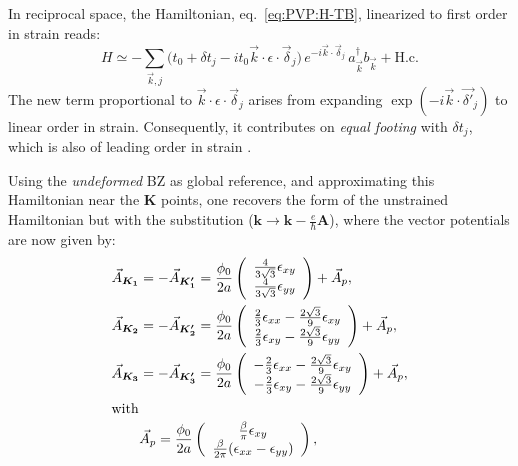 In reciprocal space, the Hamiltonian, eq.~\ref{eq:PVP:H-TB}, linearized to first order in strain reads:
\begin{equation}
  H \simeq -\sum_{\vec{k},j} \bigl(
  t_0 + \delta t_j - it_0\vec{k}\cdot\epsilon\cdot\vec{\delta}_j
  \bigr) \, e^{-i\vec{k}\cdot\vec{\delta}_j} \,
  a_{\vec{k}}^{\dagger}b_{\vec{k}} + \text{H.c.}
  \label{eq:H-TB-strain}
\end{equation}
The new term proportional to $\vec{k}\cdot\epsilon\cdot\vec{\delta}_j$ arises from expanding $\exp(-i\vec{k}\cdot\vec{\delta'}_j)$ to linear order in strain. Consequently, it contributes on \emph{equal footing} with $\delta t_j$, which is also of leading order in strain \cite{CastroNeto2009}.

Using the \emph{undeformed} BZ as global reference, and approximating this Hamiltonian near the $\bm{K}$ points, one recovers the form of the unstrained Hamiltonian but with the substitution ($\bm{k} \to \bm{k}-\frac{e}{\hbar} \bm{A}$), where the vector potentials are now given by:
\begin{subequations}\label{pvp-all}
\begin{align}
\vec{A}_{\bm{K_1}}&=-\vec{A}_{\bm{K_1'}}=\frac{\phi_0}{2a} \left( \begin{array}{c} \frac{4}{3\sqrt{3}}\epsilon_{xy}\\ \frac{4}{3 \sqrt{3}} \epsilon_{yy} \end{array} \right) +\vec{A}_p , \label{pvpK1}\\ 
\vec{A}_{\bm{K_2}}&=-\vec{A}_{\bm{K_2'}}=\frac{\phi_0}{2a} \left( \begin{array}{c} \frac{2}{3}\epsilon_{xx}-\frac{2\sqrt{3}}{9} \epsilon_{xy} \\ \frac{2}{3} \epsilon_{xy}-\frac{2 \sqrt{3}}{9} \epsilon_{yy} \end{array} \right)+\vec{A}_p  , \label{pvpK2} \\
\vec{A}_{\bm{K_3}}&=-\vec{A}_{\bm{K_3'}}=\frac{\phi_0}{2a} \left( \begin{array}{c} -\frac{2}{3} \epsilon_{xx}-\frac{2 \sqrt{3}}{9} \epsilon_{xy} \\ -\frac{2}{3} \epsilon_{xy}-\frac{2 \sqrt{3}}{9} \epsilon_{yy} \end{array} \right)+\vec{A}_p  , \label{pvpK3} \\
\intertext{with}
&\vec{A}_p=\frac{\phi_0}{2a} \left( \begin{array}{c} \frac{\beta }{\pi} \epsilon_{xy} \\ \frac{\beta }{2 \pi} (\epsilon_{xx}-\epsilon_{yy}) \end{array} \right),
\label{pvpe}
\end{align}
\end{subequations}
